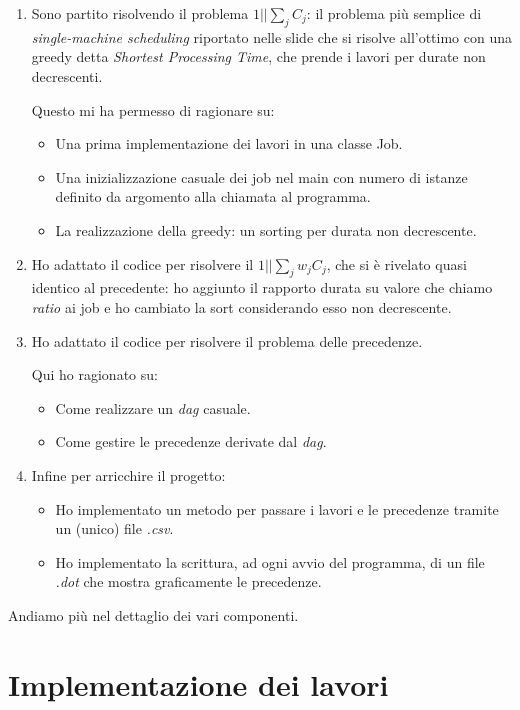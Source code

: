 \documentclass[12pt, letterpaper]{article}
\begin{document}
\begin{enumerate}

\item{Sono partito risolvendo il problema $1||\sum_j C_j$: il problema più semplice di \textit{single-machine scheduling} riportato nelle slide che si risolve all'ottimo con una greedy detta \textit{Shortest Processing Time}, che prende i lavori per durate non decrescenti.

Questo mi ha permesso di ragionare su:
\begin{itemize}
\item{Una prima implementazione dei lavori in una classe Job.}
\item{Una inizializzazione casuale dei job nel main con numero di istanze definito da argomento alla chiamata al programma.}
\item{La realizzazione della greedy: un sorting per durata non decrescente.}
\end{itemize}}

\item{Ho adattato il codice per risolvere il $1||\sum_j w_j C_j$, che si è rivelato quasi identico al precedente: ho aggiunto il rapporto durata su valore che chiamo \textit{ratio} ai job e ho cambiato la sort considerando esso non decrescente.}

\item{Ho adattato il codice per risolvere il problema delle precedenze.

Qui ho ragionato su:
	\begin{itemize}
	\item{Come realizzare un \textit{dag} casuale.}
	\item{Come gestire le precedenze derivate dal \textit{dag}.}
	\end{itemize}}

\item{Infine per arricchire il progetto:
	\begin{itemize}
	\item{Ho implementato un metodo per passare i lavori e le precedenze tramite un (unico) file \textit{.csv}.}
	\item{Ho implementato la scrittura, ad ogni avvio del programma, di un file \textit{.dot} che mostra graficamente le precedenze.}
	\end{itemize}}
\end{enumerate}

Andiamo più nel dettaglio dei vari componenti.

\section{Implementazione dei lavori}
\end{document}
